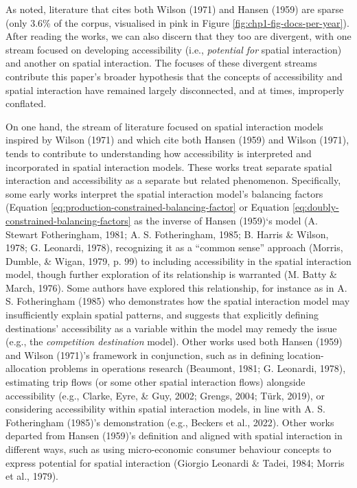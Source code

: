\documentclass[
11pt, %
oneside, %
english, %
singlespacing, %
]{macthesis} %
\begin{document}
As noted, literature that cites both Wilson (1971) and Hansen (1959) are sparse (only 3.6\% of the corpus, visualised in pink in Figure \ref{fig:chp1-fig-docs-per-year}). After reading the works, we can also discern that they too are divergent, with one stream focused on developing accessibility (i.e., \emph{potential for} spatial interaction) and another on spatial interaction. The focuses of these divergent streams contribute this paper's broader hypothesis that the concepts of accessibility and spatial interaction have remained largely disconnected, and at times, improperly conflated.

On one hand, the stream of literature focused on spatial interaction models inspired by Wilson (1971) and which cite both Hansen (1959) and Wilson (1971), tends to contribute to understanding how accessibility is interpreted and incorporated in spatial interaction models. These works treat separate spatial interaction and accessibility as a separate but related phenomenon. Specifically, some early works interpret the spatial interaction model's balancing factors (Equation \ref{eq:production-constrained-balancing-factor} or Equation \ref{eq:doubly-constrained-balancing-factors} as the inverse of Hansen (1959)`s model (A. Stewart Fotheringham, 1981; A. S. Fotheringham, 1985; B. Harris \& Wilson, 1978; G. Leonardi, 1978), recognizing it as a ``common sense'' approach (Morris, Dumble, \& Wigan, 1979, p. 99) to including accessibility in the spatial interaction model, though further exploration of its relationship is warranted (M. Batty \& March, 1976). Some authors have explored this relationship, for instance as in A. S. Fotheringham (1985) who demonstrates how the spatial interaction model may insufficiently explain spatial patterns, and suggests that explicitly defining destinations' accessibility as a variable within the model may remedy the issue (e.g., the \emph{competition destination} model). Other works used both Hansen (1959) and Wilson (1971)'s framework in conjunction, such as in defining location-allocation problems in operations research (Beaumont, 1981; G. Leonardi, 1978), estimating trip flows (or some other spatial interaction flows) alongside accessibility (e.g., Clarke, Eyre, \& Guy, 2002; Grengs, 2004; Türk, 2019), or considering accessibility within spatial interaction models, in line with A. S. Fotheringham (1985)'s demonstration (e.g., Beckers et al., 2022). Other works departed from Hansen (1959)'s definition and aligned with spatial interaction in different ways, such as using micro-economic consumer behaviour concepts to express potential for spatial interaction (Giorgio Leonardi \& Tadei, 1984; Morris et al., 1979).
\end{document}
